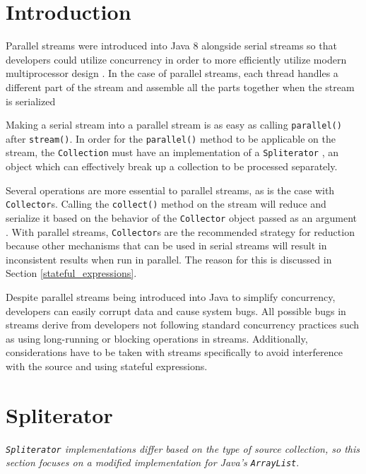 \documentclass[oneside, 12pt]{article}
\begin{document}
\section{Introduction}
Parallel streams were introduced into Java 8 alongside serial streams so that developers could utilize concurrency in order to more efficiently utilize modern multiprocessor design \autocite{ibm_streams}. In the case of parallel streams, each thread handles a different part of the stream and assemble all the parts together when the stream is serialized \autocite{parallelism_doc}

Making a serial stream into a parallel stream is as easy as calling \verb|parallel()| after \verb|stream()|. In order for the \verb|parallel()| method to be applicable on the stream, the \verb|Collection| must have an implementation of a \verb|Spliterator| \autocite{ibm_streams}, an object which can effectively break up a collection to be processed separately. 

Several operations are more essential to parallel streams, as is the case with \verb|Collector|s. Calling the \verb|collect()| method on the stream will reduce and serialize it based on the behavior of the \verb|Collector| object passed as an argument \autocite{collector_doc}. With parallel streams, \verb|Collector|s are the recommended strategy for reduction because other mechanisms that can be used in serial streams will result in inconsistent results when run in parallel. The reason for this is discussed in Section \ref{stateful_expressions}.

Despite parallel streams being introduced into Java to simplify concurrency, developers can easily corrupt data and cause system bugs. All possible bugs in streams derive from developers not following standard concurrency practices such as using long-running or blocking operations in streams. Additionally, considerations have to be taken with streams specifically to avoid interference with the source and using stateful expressions.

\section{Spliterator}
{\itshape \verb|Spliterator| implementations differ based on the type of source collection, so this section focuses on a modified implementation for Java's \verb|ArrayList|}.
\newline
\end{document}
